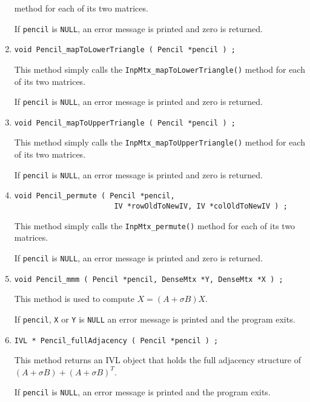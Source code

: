 \begin{enumerate}
method for each of its two matrices.
\par {}
If {\tt pencil} is {\tt NULL},
an error message is printed and zero is returned.
\item
\begin{verbatim}
void Pencil_mapToLowerTriangle ( Pencil *pencil ) ;
\end{verbatim}
This method simply calls the {\tt InpMtx\_mapToLowerTriangle()}
method for each of its two matrices.
\par {}
If {\tt pencil} is {\tt NULL},
an error message is printed and zero is returned.
\item
\begin{verbatim}
void Pencil_mapToUpperTriangle ( Pencil *pencil ) ;
\end{verbatim}
This method simply calls the {\tt InpMtx\_mapToUpperTriangle()}
method for each of its two matrices.
\par {}
If {\tt pencil} is {\tt NULL},
an error message is printed and zero is returned.
\item
\begin{verbatim}
void Pencil_permute ( Pencil *pencil, 
                       IV *rowOldToNewIV, IV *colOldToNewIV ) ;
\end{verbatim}
This method simply calls the {\tt InpMtx\_permute()}
method for each of its two matrices.
\par {}
If {\tt pencil} is {\tt NULL},
an error message is printed and zero is returned.
\item
\begin{verbatim}
void Pencil_mmm ( Pencil *pencil, DenseMtx *Y, DenseMtx *X ) ;
\end{verbatim}
This method is used to compute $X = (A + \sigma B)X$.
\par {}
If {\tt pencil}, {\tt X} or {\tt Y} is {\tt NULL}
an error message is printed and the program exits.
\item
\begin{verbatim}
IVL * Pencil_fullAdjacency ( Pencil *pencil ) ;
\end{verbatim}
This method returns an IVL object that holds the full adjacency
structure of
$(A + \sigma B) + (A + \sigma B)^T$.
\par {}
If {\tt pencil} is {\tt NULL},
an error message is printed and the program exits.
\end{enumerate}
